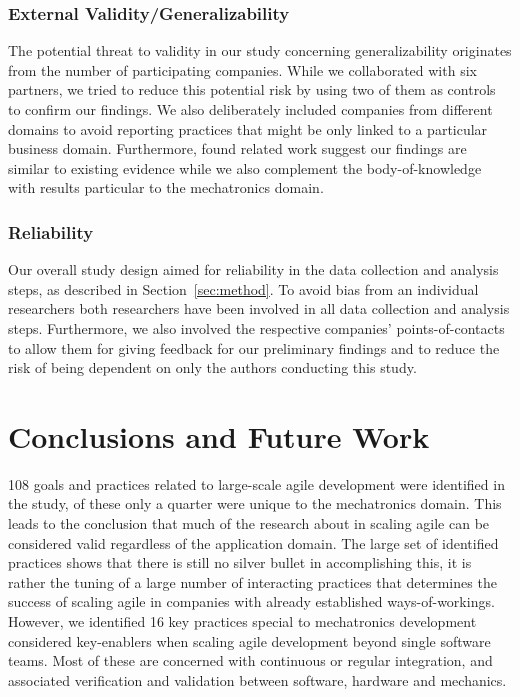 \documentclass[10pt,a4paper]{IEEEtran} %
\begin{document}
\subsubsection{External Validity/Generalizability} The potential threat to validity in our study concerning generalizability originates from the number of participating companies. While we collaborated with six partners, we tried to reduce this potential risk by using two of them as controls
to confirm our findings.
We also deliberately included companies from different domains
to avoid reporting 
practices that might be only linked to a particular business domain. 
Furthermore, found related work suggest our findings are similar to existing evidence while we also complement the body-of-knowledge with results particular to the mechatronics domain.

\subsubsection{Reliability} Our overall study design aimed for reliability in the data collection and analysis steps, as described in Section~\ref{sec:method}. To avoid bias from an individual researchers both researchers have been involved in all data collection and analysis steps. Furthermore, we also involved the respective companies' points-of-contacts to allow them for giving feedback for our preliminary findings and to reduce the risk of being dependent on only the authors conducting this study.

\section{Conclusions and Future Work} %
\label{sec:conclusion}

108 goals and practices related to large-scale agile development were identified in the study, of these only a quarter were unique to the mechatronics domain. This leads to the conclusion that much of the research about in scaling agile can be considered valid regardless of the application domain. 
%
The large set of identified practices shows that there is still no silver bullet in accomplishing this, it is rather the tuning of a large number of interacting practices that determines the success of scaling agile in companies with already established ways-of-workings.
%
%
However, we identified 16 key practices special to mechatronics development 
considered key-enablers when scaling agile development beyond single software teams. Most of these are concerned with continuous or regular integration, and associated verification and validation between software, hardware and mechanics.
\end{document}

